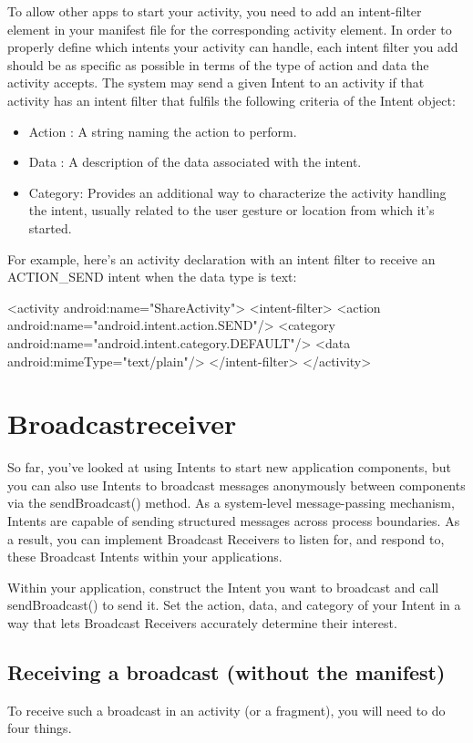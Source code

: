 To allow other apps to start your activity, you need to add an intent-filter element in your manifest file for the corresponding activity element. In order to properly define which intents your activity can handle, each intent filter you add should be as specific as possible in terms of the type of action and data the activity accepts. The system may send a given Intent to an activity if that activity has an intent filter that fulfils the following criteria of the Intent object:

\begin{itemize}
	\item Action : A string naming the action to perform.
	\item Data : A description of the data associated with the intent.
	\item Category: Provides an additional way to characterize the activity handling the intent, usually related to the user gesture or location from which it's started.
\end{itemize}

For example, here's an activity declaration with an intent filter to receive an ACTION\_SEND intent when the data type is text:

\begin{xml}
<activity android:name="ShareActivity">
	<intent-filter>
		<action android:name="android.intent.action.SEND"/>
		<category android:name="android.intent.category.DEFAULT"/>
		<data android:mimeType="text/plain"/>
	</intent-filter>
</activity>
\end{xml}

\section{Broadcastreceiver}
So far, you’ve looked at using Intents to start new application components, but you can also use Intents to broadcast messages anonymously between components via the sendBroadcast() method. As a system-level message-passing mechanism, Intents are capable of sending structured messages across process boundaries. As a result, you can implement Broadcast Receivers to listen for, and respond to, these Broadcast Intents within your applications.

Within your application, construct the Intent you want to broadcast and call sendBroadcast() to send it. Set the action, data, and category of your Intent in a way that lets Broadcast Receivers accurately determine their interest.

\subsection{Receiving a broadcast (without the manifest)}
To receive such a broadcast in an activity (or a fragment), you will need to do four
things.

